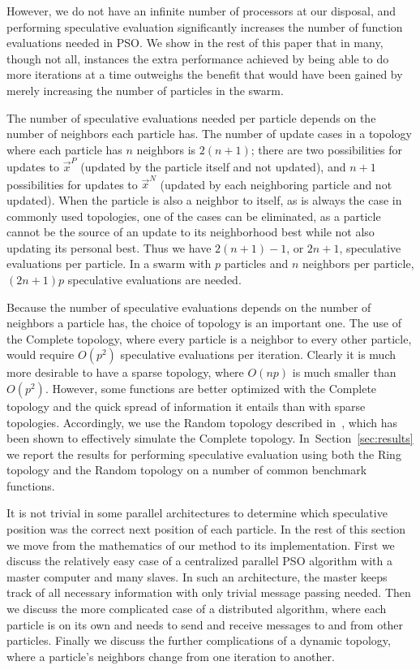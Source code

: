 \documentclass[journal,letterpaper]{IEEEtran}
\renewcommand{\sec}[1]{Section~\ref{sec:#1}}
\providecommand{\pers}{\ensuremath{P}}
\providecommand{\neigh}{\ensuremath{N}}
\providecommand{\nbest}{\ensuremath{\Vec{x}^\neigh}}
\providecommand{\pbest}{\ensuremath{\Vec{x}^\pers}}
\begin{document}
However, we do not have an infinite number of processors at our disposal, and
performing speculative evaluation significantly increases the number of
function evaluations needed in PSO.  We show in the rest of this paper that in
many, though not all, instances the extra performance achieved by being able to
do more iterations at a time outweighs the benefit that would have been gained
by merely increasing the number of particles in the swarm.

The number of speculative evaluations needed per particle depends on the number
of neighbors each particle has.  The number of update cases in a topology where
each particle has $n$ neighbors is $2(n+1)$; there are two possibilities for
updates to $\pbest$ (updated by the particle itself and not updated), and $n+1$
possibilities for updates to $\nbest$ (updated by each neighboring particle and
not updated).  When the particle is also a neighbor to itself, as is always the
case in commonly used topologies, one of the cases can be eliminated, as a
particle cannot be the source of an update to its neighborhood best while not
also updating its personal best.  Thus we have $2(n+1)-1$, or $2n+1$,
speculative evaluations per particle.  In a swarm with $p$ particles and $n$
neighbors per particle, $(2n+1)p$ speculative evaluations are needed.

Because the number of speculative evaluations depends on the number of
neighbors a particle has, the choice of topology is an important one.  The use
of the Complete topology, where every particle is a neighbor to every other
particle, would require $O(p^2)$ speculative evaluations per iteration.
Clearly it is much more desirable to have a sparse topology, where $O(np)$ is
much smaller than $O(p^2)$.  However, some functions are better optimized with
the Complete topology and the quick spread of information it entails than with
sparse topologies.  Accordingly, we use the Random topology described
in~\cite{mcnabb-2009-large-particle-swarms}, which has been shown to
effectively simulate the Complete topology.  In~\sec{results} we report the
results for performing speculative evaluation using both the Ring topology and
the Random topology on a number of common benchmark functions.

It is not trivial in some parallel architectures to determine which speculative
position was the correct next position of each particle.  In the rest of this
section we move from the mathematics of our method to its implementation.
First we discuss the relatively easy case of a centralized parallel PSO
algorithm with a master computer and many slaves.  In such an architecture, the
master keeps track of all necessary information with only trivial message
passing needed.  Then we discuss the more complicated case of a distributed
algorithm, where each particle is on its own and needs to send and receive
messages to and from other particles.  Finally we discuss the further
complications of a dynamic topology, where a particle's neighbors change from
one iteration to another.
\end{document}
